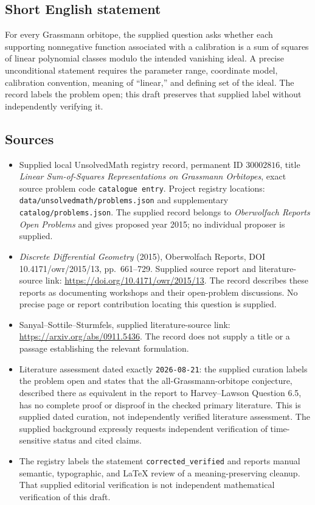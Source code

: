 \documentclass[11pt]{article}
\begin{document}
\subsection{Short English statement}
For every Grassmann orbitope, the supplied question asks whether each supporting nonnegative function associated with a calibration is a sum of squares of linear polynomial classes modulo the intended vanishing ideal. A precise unconditional statement requires the parameter range, coordinate model, calibration convention, meaning of ``linear,'' and defining set of the ideal. The record labels the problem open; this draft preserves that supplied label without independently verifying it.
\subsection{Sources}
\begin{itemize}
\item Supplied local UnsolvedMath registry record, permanent ID \(30002816\), title \emph{Linear Sum-of-Squares Representations on Grassmann Orbitopes}, exact source problem code \texttt{catalogue entry}. Project registry locations: \texttt{data/unsolvedmath/problems.json} and supplementary \texttt{catalog/problems.json}. The supplied record belongs to \emph{Oberwolfach Reports Open Problems} and gives proposed year 2015; no individual proposer is supplied.
\item \emph{Discrete Differential Geometry} (2015), Oberwolfach Reports, DOI 10.4171/owr/2015/13, pp.\ 661--729. Supplied source report and literature-source link: \url{https://doi.org/10.4171/owr/2015/13}. The record describes these reports as documenting workshops and their open-problem discussions. No precise page or report contribution locating this question is supplied.
\item Sanyal--Sottile--Sturmfels, supplied literature-source link: \url{https://arxiv.org/abs/0911.5436}. The record does not supply a title or a passage establishing the relevant formulation.
\item Literature assessment dated exactly \texttt{2026-08-21}: the supplied curation labels the problem open and states that the all-Grassmann-orbitope conjecture, described there as equivalent in the report to Harvey--Lawson Question 6.5, has no complete proof or disproof in the checked primary literature. This is supplied dated curation, not independently verified literature assessment. The supplied background expressly requests independent verification of time-sensitive status and cited claims.
\item The registry labels the statement \texttt{corrected\_verified} and reports manual semantic, typographic, and LaTeX review of a meaning-preserving cleanup. That supplied editorial verification is not independent mathematical verification of this draft.
\end{itemize}
\end{document}
